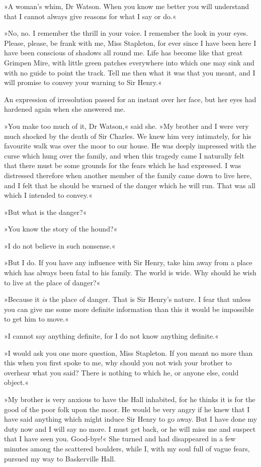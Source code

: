 »A woman's whim, Dr Watson. When you know me better you will understand that I cannot always give reasons for what I say or do.«

»No, no. I remember the thrill in your voice. I remember the look in your eyes. Please, please, be frank with me, Miss Stapleton, for ever since I have been here I have been conscious of shadows all round me. Life has become like that great Grimpen Mire, with little green patches everywhere into which one may sink and with no guide to point the track. Tell me then what it was that you meant, and I will promise to convey your warning to Sir Henry.«

An expression of irresolution passed for an instant over her face, but her eyes had hardened again when she answered me.

»You make too much of it, Dr Watson,« said she. »My brother and I were very much shocked by the death of Sir Charles. We knew him very intimately, for his favourite walk was over the moor to our house. He was deeply impressed with the curse which hung over the family, and when this tragedy came I naturally felt that there must be some grounds for the fears which he had expressed. I was distressed therefore when another member of the family came down to live here, and I felt that he should be warned of the danger which he will run. That was all which I intended to convey.«

»But what is the danger?«

»You know the story of the hound?«

»I do not believe in such nonsense.«

»But I do. If you have any influence with Sir Henry, take him away from a place which has always been fatal to his family. The world is wide. Why should he wish to live at the place of danger?«

»Because it \textit{is} the place of danger. That is Sir Henry's nature. I fear that unless you can give me some more definite information than this it would be impossible to get him to move.«

»I cannot say anything definite, for I do not know anything definite.«

»I would ask you one more question, Miss Stapleton. If you meant no more than this when you first spoke to me, why should you not wish your brother to overhear what you said? There is nothing to which he, or anyone else, could object.«

»My brother is very anxious to have the Hall inhabited, for he thinks it is for the good of the poor folk upon the moor. He would be very angry if he knew that I have said anything which might induce Sir Henry to go away. But I have done my duty now and I will say no more. I must get back, or he will miss me and suspect that I have seen you. Good-bye!« She turned and had disappeared in a few minutes among the scattered boulders, while I, with my soul full of vague fears, pursued my way to Baskerville Hall.

